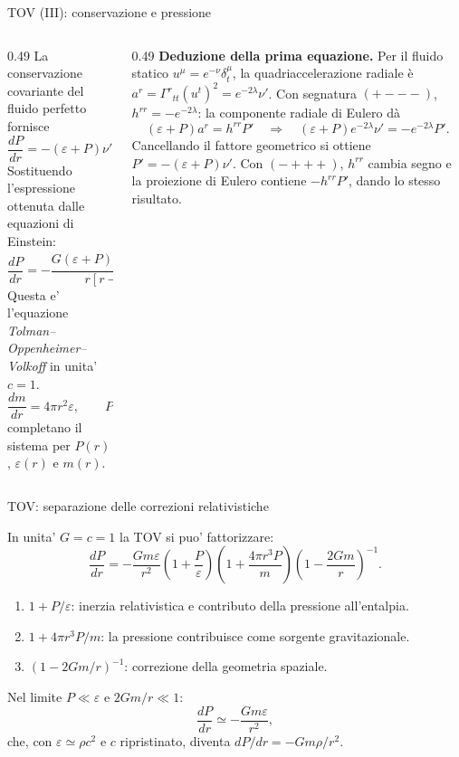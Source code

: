 \begin{frame}[t]{TOV (III): conservazione e pressione}\small\raggedright

    \begin{columns}[T]
        \begin{column}{0.49\textwidth}
La conservazione covariante del fluido perfetto fornisce
\[
\frac{dP}{dr}=-(\varepsilon+P)\nu'.
\]
Sostituendo l'espressione ottenuta dalle equazioni di Einstein:
\[
\boxed{
\frac{dP}{dr}=-\frac{G(\varepsilon+P)
[m(r)+4\pi r^3P]}{r[r-2Gm(r)]}.}
\]
Questa e' l'equazione \emph{Tolman--Oppenheimer--Volkoff} in unita' $c=1$.
\[
\frac{dm}{dr}=4\pi r^2\varepsilon,\qquad
P=P(\varepsilon)
\]
completano il sistema per $P(r)$, $\varepsilon(r)$ e $m(r)$.
        \end{column}
        \begin{column}{0.49\textwidth}
\textbf{Deduzione della prima equazione.}
Per il fluido statico $u^\mu=e^{-\nu}\delta^\mu_t$,
la quadriaccelerazione radiale è
$a^r=\Gamma^r{}_{tt}(u^t)^2=e^{-2\lambda}\nu'$.
Con segnatura $(+---)$, $h^{rr}=-e^{-2\lambda}$:
la componente radiale di Eulero dà
\[
(\varepsilon+P)a^r=h^{rr}P'
\quad\Longrightarrow\quad
(\varepsilon+P)e^{-2\lambda}\nu'
=-e^{-2\lambda}P'.
\]
Cancellando il fattore geometrico si ottiene
$P'=-(\varepsilon+P)\nu'$.
Con $(-+++)$, $h^{rr}$ cambia segno e la proiezione
di Eulero contiene $-h^{rr}P'$, dando lo stesso risultato.    
        \end{column}
    \end{columns}
\end{frame}

\begin{frame}[t]{TOV: separazione delle correzioni relativistiche}\small\raggedright
In unita' $G=c=1$ la TOV si puo' fattorizzare:
\[
\frac{dP}{dr}=-\frac{Gm\varepsilon}{r^2}
\left(1+\frac{P}{\varepsilon}\right)
\left(1+\frac{4\pi r^3P}{m}\right)
\left(1-\frac{2Gm}{r}\right)^{-1}.
\]
\begin{enumerate}
\item $1+P/\varepsilon$: inerzia relativistica e contributo della pressione all'entalpia.
\item $1+4\pi r^3P/m$: la pressione contribuisce come sorgente gravitazionale.
\item $(1-2Gm/r)^{-1}$: correzione della geometria spaziale.
\end{enumerate}
Nel limite $P\ll\varepsilon$ e $2Gm/r\ll1$:
\[
\frac{dP}{dr}\simeq-\frac{Gm\varepsilon}{r^2},
\]
che, con $\varepsilon\simeq\rho c^2$ e $c$ ripristinato, diventa $dP/dr=-Gm\rho/r^2$.
\end{frame}

